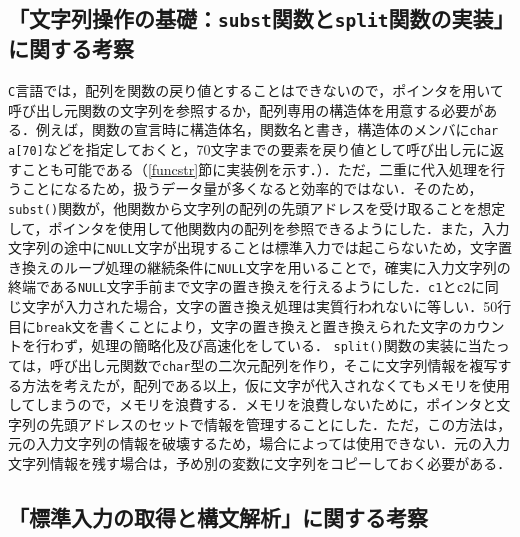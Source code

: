 \subsection{「文字列操作の基礎：\texttt{subst}関数と\texttt{split}関数の実装」に関する考察}

\verb|C|言語では，配列を関数の戻り値とすることはできないので，ポインタを用いて呼び出し元関数の文字列を参照するか，配列専用の構造体を用意する必要がある．例えば，関数の宣言時に構造体名，関数名と書き，構造体のメンバに\verb|char a[70]|などを指定しておくと，70文字までの要素を戻り値として呼び出し元に返すことも可能である（\ref{funcstr}節に実装例を示す．）．ただ，二重に代入処理を行うことになるため，扱うデータ量が多くなると効率的ではない．そのため，\verb|subst()|関数が，他関数から文字列の配列の先頭アドレスを受け取ることを想定して，ポインタを使用して他関数内の配列を参照できるようにした．また，入力文字列の途中に\verb|NULL|文字が出現することは標準入力では起こらないため，文字置き換えのループ処理の継続条件に\verb|NULL|文字を用いることで，確実に入力文字列の終端である\verb|NULL|文字手前まで文字の置き換えを行えるようにした．\verb|c1|と\verb|c2|に同じ文字が入力された場合，文字の置き換え処理は実質行われないに等しい．50行目に\verb|break|文を書くことにより，文字の置き換えと置き換えられた文字のカウントを行わず，処理の簡略化及び高速化をしている．
\verb|split()|関数の実装に当たっては，呼び出し元関数で\verb|char|型の二次元配列を作り，そこに文字列情報を複写する方法を考えたが，配列である以上，仮に文字が代入されなくてもメモリを使用してしまうので，メモリを浪費する．メモリを浪費しないために，ポインタと文字列の先頭アドレスのセットで情報を管理することにした．ただ，この方法は，元の入力文字列の情報を破壊するため，場合によっては使用できない．元の入力文字列情報を残す場合は，予め別の変数に文字列をコピーしておく必要がある．

\subsection{「標準入力の取得と構文解析」に関する考察}

